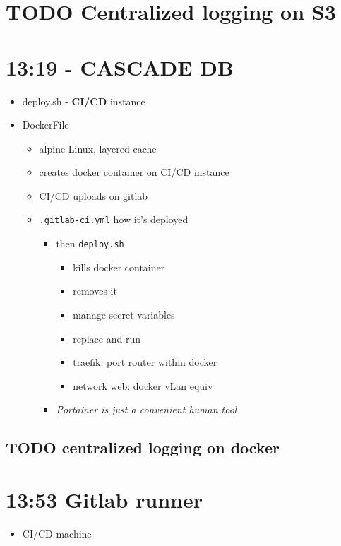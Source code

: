 \documentclass[11pt]{article}
\begin{document}
\section*{{\bfseries\sffamily TODO} Centralized logging on S3}
\label{sec:orged365bf}
\section*{13:19 - CASCADE DB}
\label{sec:org0aef436}
\begin{itemize}
\item deploy.sh - \textbf{CI/CD} instance
\item DockerFile
\begin{itemize}
\item alpine Linux, layered cache
\item creates docker container on CI/CD instance
\item CI/CD uploads on gitlab
\item \texttt{.gitlab-ci.yml} how it's deployed
\begin{itemize}
\item then \texttt{deploy.sh}
\begin{itemize}
\item kills docker container
\item removes it
\item manage secret variables
\item replace and run
\item traefik: port router within docker
\item network web: docker vLan equiv
\end{itemize}
\item \emph{Portainer is just a convenient human tool}
\end{itemize}
\end{itemize}
\end{itemize}

\subsection*{{\bfseries\sffamily TODO} centralized logging on docker}
\label{sec:org3c114e9}

\section*{13:53 Gitlab runner}
\label{sec:org275c6e5}
\begin{itemize}
\item CI/CD machine
\end{itemize}
\end{document}
